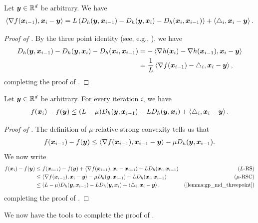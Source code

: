 \begin{lemma}
\label{lemma:gp_md_threepoint}
Let $\bm{y}\in\mathbb{R}^d$ be arbitrary. We have
\begin{align*}
    \left\langle \nabla f(\bm{x}_{i-1}), \bm{x}_i-\bm{y} \right\rangle = L\left(D_h(\bm{y},\bm{x}_{i-1})-D_h(\bm{y},\bm{x}_i)-D_h(\bm{x}_i,\bm{x}_{i-1})\right) + \left\langle \triangle_i, \bm{x}_i-\bm{y} \right\rangle.
\end{align*}
\end{lemma}
\begin{proof}[Proof of ]
By the three point identity (see, e.g., \cite[Equation (A.9)]{syls16}), we have
\begin{align*}
    D_h(\bm{y},\bm{x}_{i-1})-D_h(\bm{y},\bm{x}_i)-D_h(\bm{x}_i,\bm{x}_{i-1})&=-\left\langle \nabla h(\bm{x}_i)-\nabla h(\bm{x}_{i-1}),\bm{x}_i-\bm{y} \right\rangle \\
    &= \frac{1}{L}\left\langle \nabla f(\bm{x}_{i-1})-\triangle_i,\bm{x}_i-\bm{y} \right\rangle,
\end{align*}
completing the proof of .
\end{proof}
\begin{lemma}
\label{lemma:gp_md_singlestep}
Let $\bm{y}\in\mathbb{R}^d$ be arbitrary. For every iteration $i$, we have
\begin{align*}
    f(\bm{x}_i)-f(\bm{y}) \le (L-\mu)D_h(\bm{y},\bm{x}_{i-1}) - LD_h(\bm{y},\bm{x}_i) + \left\langle \triangle_i,\bm{x}_i-\bm{y} \right\rangle.
\end{align*}
\end{lemma}
\begin{proof}[Proof of ]
The definition of $\mu$-relative strong convexity tells us that
\begin{align*}
    f(\bm{x}_{i-1})-f(\bm{y}) \le \left\langle \nabla f(\bm{x}_{i-1}), \bm{x}_{i-1}-\bm{y} \right\rangle - \mu D_h(\bm{y},\bm{x}_{i-1}).
\end{align*}
We now write
\begin{align*}
    f(\vx_i)-f(\vy) &\le f(\vx_{i-1})-f(\vy) + \ip{\nabla f(\vx_{i-1}), \vx_i-\vx_{i-1}} + LD_h(\vx_i,\vx_{i-1}) & \text{($L$-RS)} \\
    &\le \ip{\nabla f(\vx_{i-1}), \vx_i-\vy}-\mu D_h(\vy,\vx_{i-1}) + LD_h(\vx_i,\vx_{i-1}) & \text{($\mu$-RSC)} \\
    &\le (L-\mu)D_h(\vy,\vx_{i-1}) - LD_h(\vy,\vx_i) + \ip{\triangle_i,\vx_i-\vy}, & \text{(\Cref{lemma:gp_md_threepoint})}
\end{align*}
completing the proof of .
\end{proof}

We now have the tools to complete the proof of .

